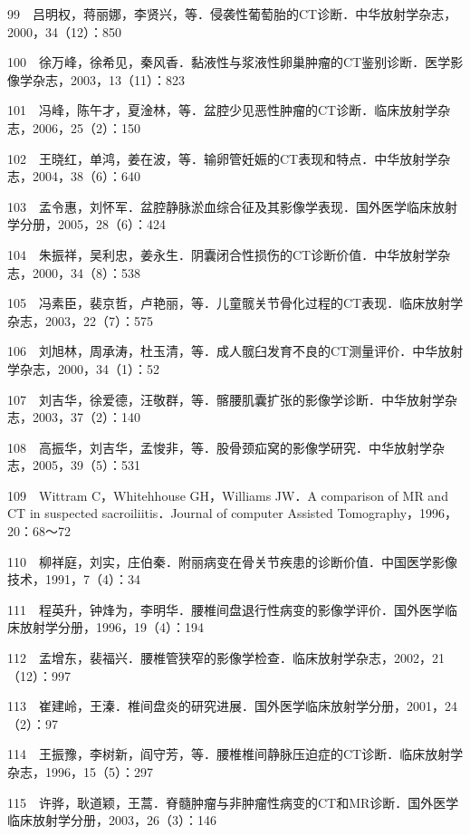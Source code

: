 99　吕明权，蒋丽娜，李贤兴，等．侵袭性葡萄胎的CT诊断．中华放射学杂志，2000，34（12）：850

100　徐万峰，徐希见，秦风香．黏液性与浆液性卵巢肿瘤的CT鉴别诊断．医学影像学杂志，2003，13（11）：823

101　冯峰，陈午才，夏淦林，等．盆腔少见恶性肿瘤的CT诊断．临床放射学杂志，2006，25（2）：150

102　王晓红，单鸿，姜在波，等．输卵管妊娠的CT表现和特点．中华放射学杂志，2004，38（6）：640

103　孟令惠，刘怀军．盆腔静脉淤血综合征及其影像学表现．国外医学临床放射学分册，2005，28（6）：424

104　朱振祥，吴利忠，姜永生．阴囊闭合性损伤的CT诊断价值．中华放射学杂志，2000，34（8）：538

105　冯素臣，裴京哲，卢艳丽，等．儿童髋关节骨化过程的CT表现．临床放射学杂志，2003，22（7）：575

106　刘旭林，周承涛，杜玉清，等．成人髋臼发育不良的CT测量评价．中华放射学杂志，2000，34（1）：52

107　刘吉华，徐爱德，汪敬群，等．髂腰肌囊扩张的影像学诊断．中华放射学杂志，2003，37（2）：140

108　高振华，刘吉华，孟悛非，等．股骨颈疝窝的影像学研究．中华放射学杂志，2005，39（5）：531

109　Wittram C，Whitehhouse GH，Williams JW．A comparison of MR and CT
in suspected sacroiliitis．Journal of computer Assisted
Tomography，1996，20：68～72

110　柳祥庭，刘实，庄伯秦．附丽病变在骨关节疾患的诊断价值．中国医学影像技术，1991，7（4）：34

111　程英升，钟烽为，李明华．腰椎间盘退行性病变的影像学评价．国外医学临床放射学分册，1996，19（4）：194

112　孟增东，裴福兴．腰椎管狭窄的影像学检查．临床放射学杂志，2002，21（12）：997

113　崔建岭，王溱．椎间盘炎的研究进展．国外医学临床放射学分册，2001，24（2）：97

114　王振豫，李树新，阎守芳，等．腰椎椎间静脉压迫症的CT诊断．临床放射学杂志，1996，15（5）：297

115　许骅，耿道颖，王蒿．脊髓肿瘤与非肿瘤性病变的CT和MR诊断．国外医学临床放射学分册，2003，26（3）：146

